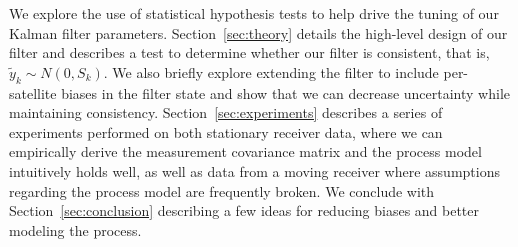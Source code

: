 We explore the use of statistical hypothesis tests to help drive the tuning of our Kalman filter parameters.  Section~\ref{sec:theory} details the high-level design of our filter and describes a test to determine whether our filter is consistent, that is, $\tilde{y}_k \sim N(0,S_k)$.  We also briefly explore extending the filter to include per-satellite biases in the filter state and show that we can decrease uncertainty while maintaining consistency.  Section~\ref{sec:experiments} describes a series of experiments performed on both stationary receiver data, where we can empirically derive the measurement covariance matrix and the process model intuitively holds well, as well as data from a moving receiver where assumptions regarding the process model are frequently broken.  We conclude with Section~\ref{sec:conclusion} describing a few ideas for reducing biases and better modeling the process.
